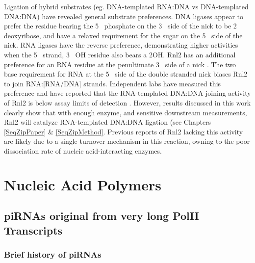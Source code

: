     Ligation of hybrid substrates (eg. DNA-templated RNA:DNA vs DNA-templated DNA:DNA) have revealed general substrate preferences. DNA ligases appear to prefer the residue bearing the 5\textprime~ phosphate on the 3\textprime~ side of the nick to be 2\textprime~ deoxyribose, and have a relaxed requirement for the sugar on the 5\textprime~ side of the nick. RNA ligases have the reverse preference, demonstrating higher activities when the 5\textprime~ strand, 3\textprime~ OH residue also bears a 2\textprime OH. Rnl2 has an additional preference for an RNA residue at the penultimate 3\textprime~ side of a nick \citep{Ho2002b,Ho2004, Nandakumar2004a, Nandakumar2006}. The two base requirement for RNA at the 5\textprime~ side of the double stranded nick biases Rnl2 to join RNA:[RNA/DNA] strands. Independent labs have measured this preference and have reported that the RNA-templated DNA:DNA joining activity of Rnl2 is below assay limits of detection \citep{Bullard2006}. However, results discussed in this work clearly show that with enough enzyme, and sensitive downstream measurements, Rnl2 will catalyze RNA-templated DNA:DNA ligation (see Chapters \ref{SeqZipPaper} \& \ref{SeqZipMethod}. Previous reports of Rnl2 lacking this activity are likely due to a single turnover mechanism in this reaction, owning to the poor dissociation rate of nucleic acid-interacting enzymes.



\section{Nucleic Acid Polymers}\label{hd: piRNA section}

  \subsection{piRNAs original from very long PolII Transcripts}\label{sec:Mouse piRNAs}

    \subsubsection{Brief history of piRNAs}

